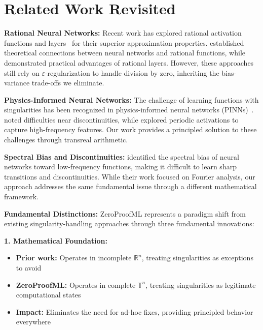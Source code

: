 \documentclass[twoside,11pt]{article}
\begin{document}
\section{Related Work Revisited}

\textbf{Rational Neural Networks:}
Recent work has explored rational activation functions and layers~\citep{boulle2020rational,montanher2020pade,molina2020pade} for their superior approximation properties. \citet{telgarsky2017neural} established theoretical connections between neural networks and rational functions, while \citet{boulle2020rational} demonstrated practical advantages of rational layers. However, these approaches still rely on $\varepsilon$-regularization to handle division by zero, inheriting the bias-variance trade-offs we eliminate.

\textbf{Physics-Informed Neural Networks:}
The challenge of learning functions with singularities has been recognized in physics-informed neural networks (PINNs)~\citep{wang2021understanding,krishnapriyan2021characterizing}. \citet{jagtap2020conservative} noted difficulties near discontinuities, while \citet{sitzmann2020implicit} explored periodic activations to capture high-frequency features. Our work provides a principled solution to these challenges through transreal arithmetic.

\textbf{Spectral Bias and Discontinuities:}
\citet{rahaman2019spectral} identified the spectral bias of neural networks toward low-frequency functions, making it difficult to learn sharp transitions and discontinuities. While their work focused on Fourier analysis, our approach addresses the same fundamental issue through a different mathematical framework.

\textbf{Fundamental Distinctions:}
ZeroProofML represents a paradigm shift from existing singularity-handling approaches through three fundamental innovations:

\textbf{1. Mathematical Foundation:}
\begin{itemize}
\item \textbf{Prior work:} Operates in incomplete $\mathbb{R}^n$, treating singularities as exceptions to avoid
\item \textbf{ZeroProofML:} Operates in complete $\mathbb{T}^n$, treating singularities as legitimate computational states
\item \textbf{Impact:} Eliminates the need for ad-hoc fixes, providing principled behavior everywhere
\end{itemize}
\end{document}
